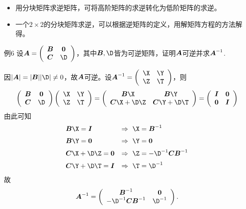 \begin{frame}
  \begin{itemize}
  \item   用分块矩阵求逆矩阵，可将高阶矩阵的求逆转化为低阶矩阵的求逆。\\[0.1in]
  \item   一个$2\times 2$的分块矩阵求逆，可以根据逆矩阵的定义，用解矩阵方程的方法解得。
  \end{itemize}
\end{frame}


\begin{frame}
  \begin{footnotesize}
    \begin{exampleblock}{例6}
      设$\A=\left(
      \begin{array}{cc}
        \B&\zero\\
        \C&\D
      \end{array}
      \right)$，其中$\B,\D$皆为可逆矩阵，证明$\boldsymbol{A}$可逆并求$\boldsymbol{A}^{-1}$.
    \end{exampleblock}
    \pause 
    \jiename
    因$|\A|=|\B||\D|\ne 0$，故$\boldsymbol{A}$可逆。设$\A^{-1}=\left(
    \begin{array}{cc}
      \X&\Y\\
      \Z&\T
    \end{array}
    \right)$，则
    $$
    \left(
    \begin{array}{cc}
      \B&\zero\\
      \C&\D
    \end{array}
    \right) \left(
    \begin{array}{cc}
      \X&\Y\\
      \Z&\T
    \end{array}
    \right)=\left(
    \begin{array}{cc}
      \B\X&\B\Y\\
      \C\X+\D\Z&\C\Y+\D\T
    \end{array}
    \right) = \left(
    \begin{array}{cc}
      \II & \zero\\
      \zero & \II
    \end{array}
    \right)
    $$
    \pause
    由此可知
    $$
    \begin{array}{ll}
      \B\X = \II   & \Rightarrow ~ \X = \B^{-1}\\[0.2cm]
      \B\Y = \zero & \Rightarrow ~ \Y = \zero\\[0.2cm]
      \C\X+\D\Z = \zero & \Rightarrow ~ \Z = -\D^{-1}\C\B^{-1}\\[0.2cm]
      \C\Y+\D\T = \II & \Rightarrow ~ \T = \D^{-1}
    \end{array}
    $$
    \pause 
    故
    $$
    \A^{-1} = \left(
    \begin{array}{cc}
      \B^{-1} & \zero\\
      -\D^{-1}\C\B^{-1} & \D^{-1}
    \end{array}
    \right).
    $$
  \end{footnotesize}
\end{frame}


